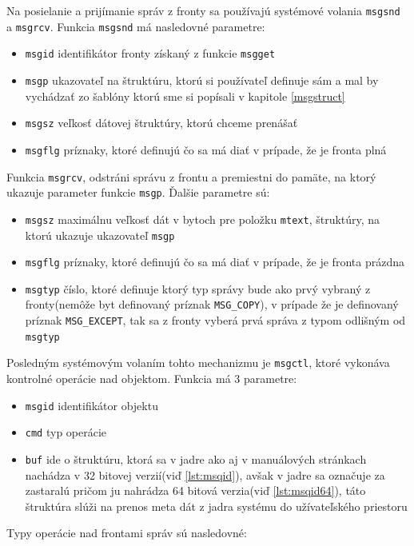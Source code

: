 Na posielanie a prijímanie správ z fronty sa používajú systémové volania \texttt{msgsnd} a \texttt{msgrcv}. Funkcia \texttt{msgsnd} má nasledovné parametre\cite{msgop}:
\begin{itemize}
\item \texttt{msgid} identifikátor fronty získaný z funkcie \texttt{msgget}
\item \texttt{msgp} ukazovateľ na štruktúru, ktorú si používateľ definuje sám a mal by vychádzať zo šablóny ktorú sme si popísali v kapitole \ref{msgstruct}
\item \texttt{msgsz} veľkosť dátovej štruktúry, ktorú chceme prenášať
\item \texttt{msgflg} príznaky, ktoré definujú čo sa má diať v prípade, že je fronta plná
\end{itemize}
Funkcia \texttt{msgrcv}, odstráni správu z frontu a premiestni do pamäte, na ktorý ukazuje parameter funkcie \texttt{msgp}. Ďalšie parametre sú\cite{msgop}:
\begin{itemize}
\item \texttt{msgsz} maximálnu veľkosť dát v bytoch pre položku \texttt{mtext}, štruktúry, na ktorú ukazuje ukazovateľ \texttt{msgp}
\item \texttt{msgflg} príznaky, ktoré definujú čo sa má diať v prípade, že je fronta prázdna
\item \texttt{msgtyp} číslo, ktoré definuje ktorý typ správy bude ako prvý vybraný z fronty(nemôže byt definovaný príznak \texttt{MSG\_COPY}), v prípade že je definovaný príznak \texttt{MSG\_EXCEPT}, tak sa z fronty vyberá prvá správa z typom odlišným od \texttt{msgtyp}
\end{itemize}
Posledným systémovým volaním tohto mechanizmu je \texttt{msgctl}, ktoré vykonáva kontrolné operácie nad objektom. Funkcia má 3 parametre\cite{msgctl}:
\begin{itemize}
\item \texttt{msgid} identifikátor objektu
\item \texttt{cmd} typ operácie
\item \texttt{buf} ide o štruktúru, ktorá sa v jadre ako aj v manuálových stránkach nachádza v 32 bitovej verzií(viď \ref{lst:msqid}), avšak v jadre sa označuje za zastaralú pričom ju nahrádza 64 bitová verzia(viď \ref{lst:msqid64}), táto štruktúra slúži na prenos meta dát z jadra systému do užívateľského priestoru
\end{itemize}
Typy operácie nad frontami správ sú nasledovné\cite{msgctl}:
